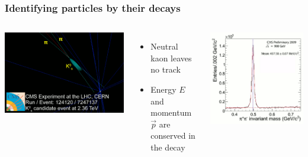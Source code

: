 \documentclass[compress]{beamer}
\begin{document}
\begin{frame}
\frametitle{Identifying particles by their decays}

\begin{columns}
\includegraphics[width=\linewidth]{cms_kshort.png}

\begin{itemize}
\item Neutral kaon leaves no track
\item Energy $E$ and momentum $\vec{p}$ are conserved in the decay
\end{itemize}

\includegraphics[width=\linewidth]{kshort-distribution.png}
\end{columns}


\end{frame}
\end{document}
